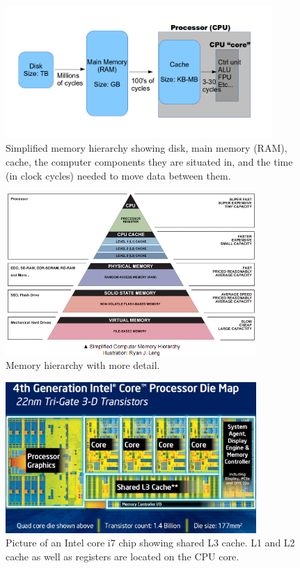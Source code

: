 \begin{figure}
  \includegraphics[width=0.9\textwidth]{../images/memory_heirarchy}
  \caption{Simplified memory hierarchy showing disk, main memory (RAM), cache, the computer components they are situated in, and the time (in clock cycles) needed to move data between them.}
  \label{performance:fig:heirarchy1}
\end{figure}
\begin{figure}
  \includegraphics[width=0.85\textwidth]{../images/hei}
  \caption{Memory hierarchy with more detail.}
  \label{performance:fig:pyramid}
\end{figure}
\begin{figure}
  \includegraphics[width=0.85\textwidth]{../images/haswelldiemap_550}
  \caption{Picture of an Intel core i7 chip showing shared L3 cache.  L1 and L2 cache as well as registers are located on the CPU core.}
  \label{performance:fig:heirarchy3}
\end{figure}
